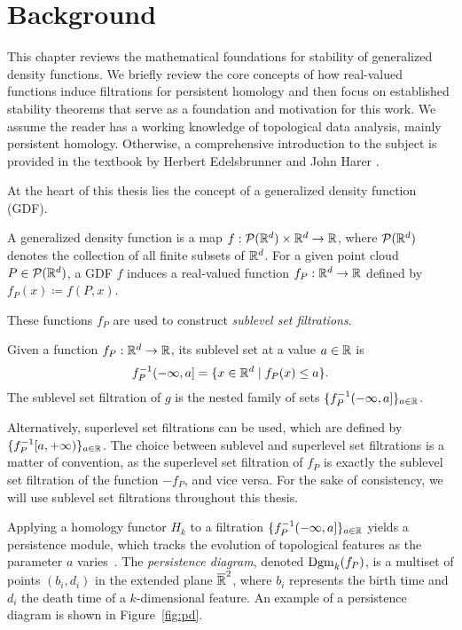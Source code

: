 \chapter{Background}
\label{chap:background}

This chapter reviews the mathematical foundations for stability of generalized
density functions. We briefly review the core concepts of how real-valued
functions induce filtrations for persistent homology and then focus on
established stability theorems that serve as a foundation and motivation for
this work. We assume the reader has a working knowledge of topological data
analysis, mainly persistent homology. Otherwise, a comprehensive introduction to
the subject is provided in the textbook by Herbert Edelsbrunner and John Harer
\cite{edelsbrunner2010computational}.

At the heart of this thesis lies the concept of a generalized density function (GDF).
\begin{definition}
    A generalized density function is a map $f : \mathcal{P}(\mathbb{R}^d) \times \mathbb{R}^d
    \to \mathbb{R}$,
    where $\mathcal{P}(\mathbb{R}^d)$ denotes the collection of all finite subsets of
    $\mathbb{R}^d$. For a given point cloud $P \in \mathcal{P}(\mathbb{R}^d)$, a GDF $f$ induces a
    real-valued function $f_P : \mathbb{R}^d \to \mathbb{R}$ defined by $f_P(x) \coloneqq f(P, x)$.
\end{definition}

These functions $f_P$ are used to construct \emph{sublevel set filtrations}.
\begin{definition}
    Given a function $f_P : \mathbb{R}^d \to \mathbb{R}$, its sublevel set at a value $a \in \mathbb{R}$ is
    \begin{equation}
        f_P^{-1}(-\infty, a] = \{ x \in \mathbb{R}^d \mid f_P(x) \leq a \}.
    \end{equation}
    The sublevel set filtration of $g$ is the nested family of sets
    $\{f_P^{-1}(-\infty, a]\}_{a \in \mathbb{R}}$.
\end{definition}
Alternatively, superlevel set filtrations can be used, which are defined by
$\{f_P^{-1}[a, +\infty)\}_{a \in \mathbb{R}}$. The choice between sublevel and superlevel
set filtrations is a matter of convention, as the superlevel set filtration of
$f_P$ is exactly the sublevel set filtration of the function $-f_P$, and vice
versa. For the sake of consistency, we will use sublevel set filtrations
throughout this thesis.

Applying a homology functor $H_k$ to a filtration $\{f_P^{-1}(-\infty, a]\}_{a \in \mathbb{R}}$
yields a persistence module, which tracks the evolution of topological features
as the parameter $a$ varies~\cite{edelsbrunner2010computational}. The
\emph{persistence diagram}, denoted $\operatorname{Dgm}_k(f_P)$, is a multiset of points
$(b_i, d_i)$ in the extended plane $\overline{\mathbb{R}}^2$, where $b_i$ represents the
birth time and $d_i$ the death time of a $k$-dimensional feature. An example of
a persistence diagram is shown in Figure~\ref{fig:pd}.

